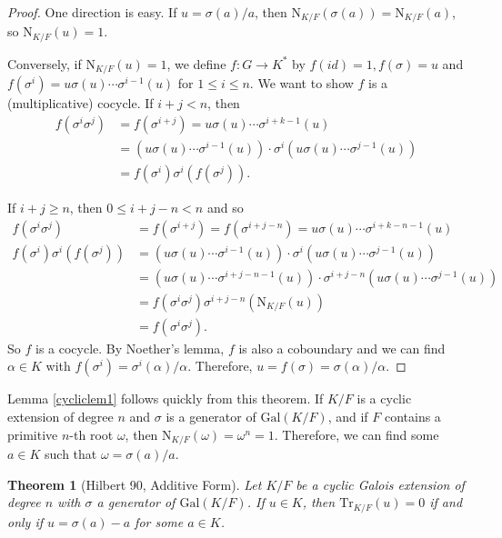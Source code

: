 \documentclass[12pt]{report}
\newtheorem{theorem}{Theorem}[section]
\theoremstyle{definition}
\newcommand{\Gal}{\text{Gal}}
\newcommand{\Tr}{\text{Tr}}
\newcommand{\nm}{\text{N}}
\begin{document}
\begin{proof}
	One direction is easy. If $u=\sigma(a)/a$, then $\nm_{K/F}(\sigma(a))=\nm_{K/F}(a)$, so $\nm_{K/F}(u)=1$.

	Conversely, if $\nm_{K/F}(u)=1$, we define $f: G\to K^*$ by $f(id)=1,f(\sigma)=u$ and $f(\sigma^i)=u\sigma(u)\cdots\sigma^{i-1}(u)$ for $1\leq i\leq n$. We want to show $f$ is a (multiplicative) cocycle. If $i+j< n$, then \begin{align*}
		f(\sigma^i\sigma^j) & = f(\sigma^{i+j})=u\sigma(u)\cdots\sigma^{i+k-1}(u)                                \\
		                    & = (u\sigma(u)\cdots\sigma^{i-1}(u))\cdot \sigma^i(u\sigma(u)\cdots\sigma^{j-1}(u)) \\
		                    & =f(\sigma^i)\sigma^i(f(\sigma^j)).
	\end{align*}

	If $i+j\geq n$, then $0\leq i+j-n<n$ and so \begin{align*}
		f(\sigma^i\sigma^j)              & = f(\sigma^{i+j})=f(\sigma^{i+j-n})=u\sigma(u)\cdots\sigma^{i+k-n-1}(u)                     \\
		f(\sigma^i)\sigma^i(f(\sigma^j)) & =(u\sigma(u)\cdots\sigma^{i-1}(u))\cdot \sigma^i(u\sigma(u)\cdots\sigma^{j-1}(u))           \\
		                                 & =(u\sigma(u)\cdots\sigma^{i+j-n-1}(u))\cdot \sigma^{i+j-n}(u\sigma(u)\cdots\sigma^{j-1}(u)) \\
		                                 & =  f(\sigma^i\sigma^j)\sigma^{i+j-n}(\nm_{K/F}(u))                                          \\
		                                 & =  f(\sigma^i\sigma^j).
	\end{align*}
	So $f$ is a cocycle. By Noether's lemma, $f$ is also a coboundary and we can find $\alpha\in K$ with $f(\sigma^i)=\sigma^i(\alpha)/\alpha$. Therefore, $u=f(\sigma)=\sigma(\alpha)/\alpha$.
\end{proof}


Lemma \ref{cycliclem1} follows quickly from this theorem. If $K/F$ is a cyclic extension of degree $n$ and $\sigma$ is a generator of $\Gal(K/F)$, and if $F$ contains a primitive $n$-th root $\omega$, then $\nm_{K/F}(\omega)=\omega^n=1$. Therefore, we can find some $a\in K$ such that $\omega=\sigma(a)/a$.

\begin{theorem}[Hilbert 90, Additive Form]
	Let $K/F$ be a cyclic Galois extension of degree $n$ with $\sigma$ a generator of $\Gal(K/F)$. If $u\in K$, then $\Tr_{K/F}(u)=0$ if and only if $u=\sigma(a)-a$ for some $a\in K$.
\end{theorem}
\end{document}
